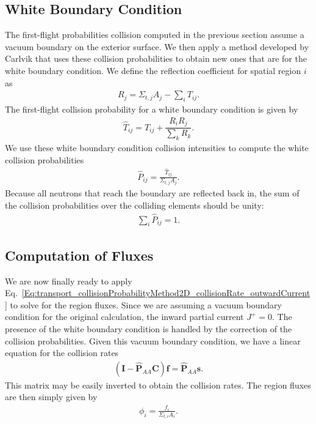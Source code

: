 \subsection{White Boundary Condition}

The first-flight probabilities collision computed in the previous section assume a vacuum boundary on the exterior surface. We then apply a method developed by Carlvik that uses these collision probabilities to obtain new ones that are for the white boundary condition. We define the reflection coefficient for spatial region $i$ as
\begin{align}
  R_j = \Sigma_{t,j} A_j - \sum_i T_{ij} .
\end{align}
The first-flight collision probability for a white boundary condition is given by
\begin{align}
  \widehat{T}_{ij} = T_{ij} + \dfrac{R_i R_j}{ \displaystyle\sum_k R_k } .
\end{align}
We use these white boundary condition collision intensities to compute the white collision probabilities
\begin{align}
  \widehat{P}_{ij} = \frac{ \widehat{T}_{ij} }{ \Sigma_{t,j} A_j } .
\end{align}
Because all neutrons that reach the boundary are reflected back in, the sum of the collision probabilities over the colliding elements should be unity:
\begin{align}
  \sum_i \widehat{P}_{ij} = 1.
\end{align}




\subsection{Computation of Fluxes}

We are now finally ready to apply Eq.~\eqref{Eq:transport_collisionProbabilityMethod2D_collisionRate_outwardCurrent} to solve for the region fluxes. Since we are assuming a vacuum boundary condition for the original calculation, the inward partial current $J^+ = 0$. The presence of the white boundary condition is handled by the correction of the collision probabilities. Given this vacuum boundary condition, we have a linear equation for the collision rates
\begin{align}
  \left( \mathbf{I} - \widehat{\mathbf{P}}_{AA} \mathbf{C} \right) \mathbf{f} = \widehat{\mathbf{P}}_{AA}\mathbf{s} .
\end{align}
This matrix may be easily inverted to obtain the collision rates. The region fluxes are then simply given by
\begin{align}
  \phi_i = \frac{ f_i }{ \Sigma_{t,i} A_i } .
\end{align}


